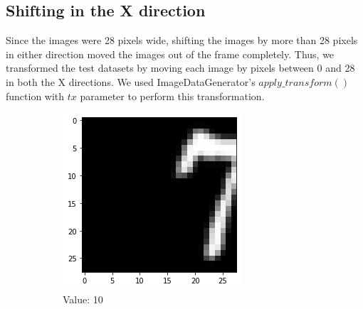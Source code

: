 \subsection{Shifting in the X direction}
Since the images were 28 pixels wide, shifting the images by more than 28 pixels in either direction moved the images out of the frame completely. Thus, we transformed the test datasets by moving each image by pixels between 0 and 28 in both the X directions. We used ImageDataGenerator's $apply\_transform()$ function with $tx$ parameter to perform this transformation.
    \begin{figure}[htb!]
        \centering
        \begin{subfigure}[b]{.3\textwidth}
            \centering
            \includegraphics[width=\linewidth]{images/shiftx1.png}
            \caption{Value: 10}
            \label{fig:Rotate-misclass0}
        \end{subfigure}%
        \begin{subfigure}[b]{.3\textwidth}
            \centering

\end{subfigure}
\end{figure}
